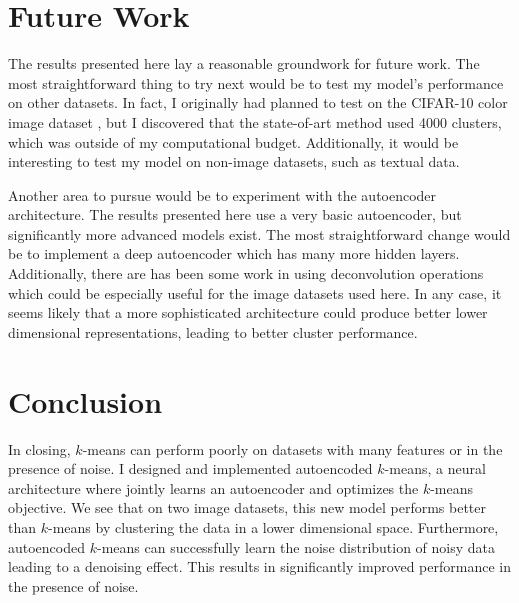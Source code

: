 \section{Future Work}
The results presented here lay a reasonable groundwork for future work. The most straightforward thing to try next would be to test my model's performance on other datasets. In fact, I originally had planned to test on the CIFAR-10 color image dataset \cite{cifar}, but I discovered that the state-of-art method used 4000 clusters, which was outside of my computational budget. Additionally, it would be interesting to test my model on non-image datasets, such as textual data.

Another area to pursue would be to experiment with the autoencoder architecture. The results presented here use a very basic autoencoder, but significantly more advanced models exist. The most straightforward change would be to implement  a deep autoencoder which has many more hidden layers. Additionally, there are has been some work in using deconvolution operations which could be especially useful for the image datasets used here. In any case, it seems likely that a more sophisticated architecture could produce better lower dimensional representations, leading to better cluster performance.

\section{Conclusion}
In closing, $k$-means can perform poorly on datasets with many features or in the presence of noise. I designed and implemented autoencoded $k$-means, a neural architecture where jointly learns an autoencoder and optimizes the $k$-means objective. We see that on two image datasets, this new model performs better than $k$-means by clustering the data in a lower dimensional space. Furthermore, autoencoded $k$-means can successfully learn the noise distribution of noisy data leading to a denoising effect. This results in significantly improved performance in the presence of noise. 